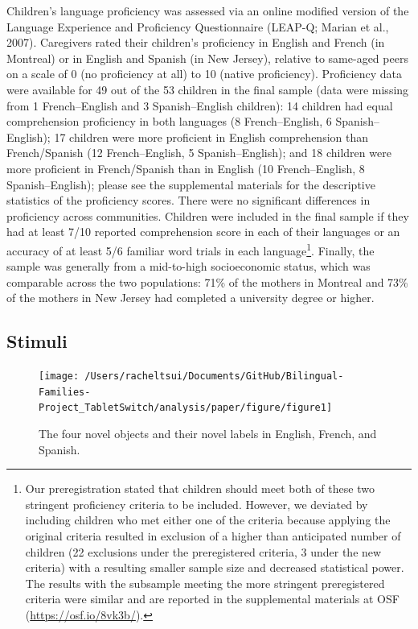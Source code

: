 \documentclass[
  man,floatsintext]{apa7}
\begin{document}
Children's language proficiency was assessed via an online modified version of the Language Experience and Proficiency Questionnaire (LEAP-Q; Marian et al., 2007). Caregivers rated their children's proficiency in English and French (in Montreal) or in English and Spanish (in New Jersey), relative to same-aged peers on a scale of 0 (no proficiency at all) to 10 (native proficiency). Proficiency data were available for 49 out of the 53 children in the final sample (data were missing from 1 French--English and 3 Spanish--English children): 14 children had equal comprehension proficiency in both languages (8 French--English, 6 Spanish--English); 17 children were more proficient in English comprehension than French/Spanish (12 French--English, 5 Spanish--English); and 18 children were more proficient in French/Spanish than in English (10 French--English, 8 Spanish--English); please see the supplemental materials for the descriptive statistics of the proficiency scores. There were no significant differences in proficiency across communities. Children were included in the final sample if they had at least 7/10 reported comprehension score in each of their languages or an accuracy of at least 5/6 familiar word trials in each language\footnote{Our preregistration stated that children should meet both of these two stringent proficiency criteria to be included. However, we deviated by including children who met either one of the criteria because applying the original criteria resulted in exclusion of a higher than anticipated number of children (22 exclusions under the preregistered criteria, 3 under the new criteria) with a resulting smaller sample size and decreased statistical power. The results with the subsample meeting the more stringent preregistered criteria were similar and are reported in the supplemental materials at OSF (\url{https://osf.io/8vk3b/}).}. Finally, the sample was generally from a mid-to-high socioeconomic status, which was comparable across the two populations: 71\% of the mothers in Montreal and 73\% of the mothers in New Jersey had completed a university degree or higher.

\hypertarget{stimuli}{%
\subsection{Stimuli}\label{stimuli}}

\begin{figure}[H]

{\centering \texttt{[image: /Users/racheltsui/Documents/GitHub/Bilingual-Families-Project\_TabletSwitch/analysis/paper/figure/figure1]} 

}

\caption{The four novel objects and their novel labels in English, French, and Spanish.}\label{fig:Figure1}
\end{figure}
\end{document}
